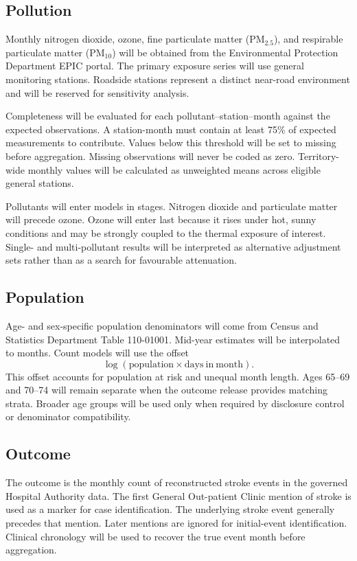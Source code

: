 \documentclass[11pt,a4paper]{article}
\begin{document}
\subsection{Pollution}

Monthly nitrogen dioxide, ozone, fine particulate matter (PM$_{2.5}$), and respirable particulate matter (PM$_{10}$) will be obtained from the Environmental Protection Department EPIC portal. The primary exposure series will use general monitoring stations. Roadside stations represent a distinct near-road environment and will be reserved for sensitivity analysis.

Completeness will be evaluated for each pollutant--station--month against the expected observations. A station-month must contain at least 75\% of expected measurements to contribute. Values below this threshold will be set to missing before aggregation. Missing observations will never be coded as zero. Territory-wide monthly values will be calculated as unweighted means across eligible general stations.

Pollutants will enter models in stages. Nitrogen dioxide and particulate matter will precede ozone. Ozone will enter last because it rises under hot, sunny conditions and may be strongly coupled to the thermal exposure of interest. Single- and multi-pollutant results will be interpreted as alternative adjustment sets rather than as a search for favourable attenuation.

\subsection{Population}

Age- and sex-specific population denominators will come from Census and Statistics Department Table 110-01001. Mid-year estimates will be interpolated to months. Count models will use the offset
\[
  \log(\mathrm{population}\times\mathrm{days\ in\ month}).
\]
This offset accounts for population at risk and unequal month length. Ages 65--69 and 70--74 will remain separate when the outcome release provides matching strata. Broader age groups will be used only when required by disclosure control or denominator compatibility.

\subsection{Outcome}

The outcome is the monthly count of reconstructed stroke events in the governed Hospital Authority data. The first General Out-patient Clinic mention of stroke is used as a marker for case identification. The underlying stroke event generally precedes that mention. Later mentions are ignored for initial-event identification. Clinical chronology will be used to recover the true event month before aggregation.
\end{document}
